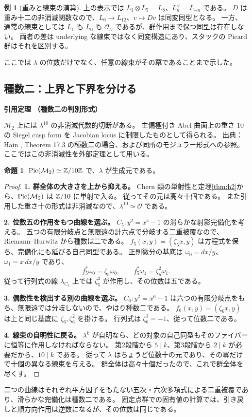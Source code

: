 \documentclass[dvipdfmx,a4paper,11pt]{article}
\theoremstyle{definition}
\newtheorem{prop}[thm]{命題}
\newtheorem{exa}[thm]{例}
\newcommand{\OO}{\mathcal O}\newcommand{\MM}{\mathcal M}\newcommand{\TT}{\mathcal T}
\newenvironment{external}[1]{\Needspace{7\baselineskip}\refstepcounter{thm}\begin{tcolorbox}[mybox,colback=blue!2,colframe=blue!40!black]\textbf{引用定理 \thethm（#1）}\par}{\end{tcolorbox}}
\begin{document}
\begin{exa}[重みと線束の演算]
上の表示では $L_3\otimes L_5=L_8$、$L_n^\vee=L_{-n}$ である。
$D$ は重み十二の非消滅関数なので、$L_0\to L_{12}$、$v\mapsto Dv$ は同変同型となる。
一方、通常の線束としては $L_1$ も $L_0$ も $\OO_U$ であるが、群作用まで保つ同型は存在しない。
両者の差は underlying な線束ではなく同変構造にあり、スタックの Picard 群はそれを区別する。
\end{exa}

ここでは $\lambda$ の位数だけでなく、任意の線束がその冪であることまで示した。

\subsection{種数二：上界と下界を分ける}
\begin{external}{種数二の判別形式}
$\MM_2$ 上には $\lambda^{10}$ の非消滅代数的切断がある。
主偏極付き Abel 曲面上の重さ $10$ の Siegel cusp form を Jacobian locus に制限したものとして得られる。
出典：Hain \cite{Hain}, Theorem 17.3 の種数二の場合、および同所のモジュラー形式への参照。
ここではこの非消滅性を外部定理として用いる。
\end{external}
\begin{prop}\label{prop:pic2}
$\Pic(\MM_2)\simeq\Z/10\Z$ で、$\lambda$ が生成元である。
\end{prop}
\begin{proof}
\textbf{1. 群全体の大きさを上から抑える。}
Chern 類の単射性と定理\ref{thm:h2}から、$\Pic(\MM_2)$ は $\mathbb Z/10$ に単射で入る。
従ってその元は高々十個である。
また引用した重さ十の形式は非消滅なので、$\lambda^{10}\simeq\OO$ である。

\textbf{2. 位数五の作用をもつ曲線を選ぶ。}
$C_5:y^2=x^5-1$ の滑らかな射影完備化を考える。
五つの有限分岐点と無限遠の計六点で分岐する二重被覆なので、Riemann--Hurwitz から種数は二である。
$f_5(x,y)=(\zeta_5x,y)$ は方程式を保ち、完備化にも延びる自己同型である。
正則微分の基底は $\omega_0=dx/y$、$\omega_1=x\,dx/y$ であり、
\[
f_5^*\omega_0=\zeta_5\omega_0,\qquad
f_5^*\omega_1=\zeta_5^2\omega_1.
\]
従って行列式の線 $\lambda_{C_5}$ 上では $\zeta_5^3$ が作用し、その位数は五である。

\textbf{3. 偶数性を検出する別の曲線を選ぶ。}
$C_6:y^2=x^6-1$ は六つの有限分岐点をもち、無限遠では分岐しないので、やはり種数二である。
$f_6(x,y)=(\zeta_6x,y)$ は上と同じ基底に $\zeta_6,\zeta_6^2$ を掛ける。
行列式は $\zeta_6^3=-1$、従って位数二である。

\textbf{4. 線束の自明性に戻る。}
$\lambda^k$ が自明なら、どの対象の自己同型もそのファイバーに恒等に作用しなければならない。
第2段階から $5\mid k$、第3段階から $2\mid k$ が必要だから、$10\mid k$ である。
従って $\lambda$ はちょうど位数十の元であり、その冪だけで十個の異なる線束を与える。
群全体は高々十個だったので、これで群全体を尽くす。
\end{proof}
二つの曲線はそれぞれ平方因子をもたない五次・六次多項式による二重被覆であり、滑らかな完備化は種数二である。
固定点群での固有値の計算では、引き戻しと順方向作用は逆数になるが、その位数は同じである。
\end{document}

